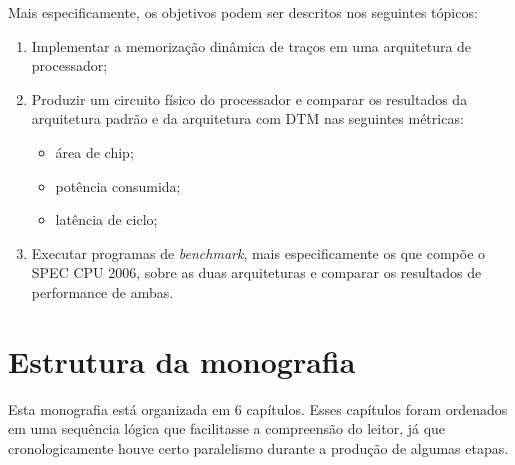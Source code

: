 Mais especificamente, os objetivos podem ser descritos nos seguintes tópicos:
\begin{enumerate}
	\item Implementar a memorização dinâmica de traços em uma arquitetura de processador;
	\item Produzir um circuito físico do processador e comparar os resultados da arquitetura padrão e da arquitetura com DTM nas seguintes métricas:
	
	\begin{itemize}
		\item área de chip;
		\item potência consumida;
		\item latência de ciclo;
	\end{itemize}
	
	\item Executar programas de \textit{benchmark}, mais especificamente os que compõe o SPEC CPU 2006, sobre as duas arquiteturas e comparar os resultados de performance de ambas.
\end{enumerate}

\section{Estrutura da monografia}
\label{Introducao:Estrutura}


Esta monografia está organizada em 6 capítulos. Esses capítulos foram ordenados em uma sequência lógica que facilitasse a compreensão do leitor, já que cronologicamente houve certo paralelismo durante a produção de algumas etapas.

